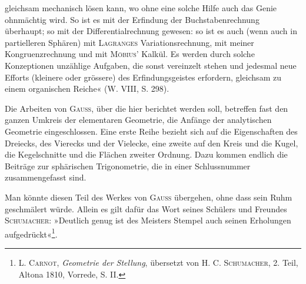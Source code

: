 gleichsam mechanisch lösen kann, wo ohne eine solche Hilfe auch das Genie
ohnmächtig wird. So ist es mit der Erfindung der Buchstabenrechnung
\clearpage{}
\noindent überhaupt; so mit der Differentialrechnung gewesen: so ist es auch (wenn auch
in partielleren Sphären) mit \textsc{Lagranges} Variationsrechnung, mit meiner Kongruenzrechnung
und mit \textsc{Möbius}’ Kalkül. Es werden durch solche Konzeptionen
unzählige Aufgaben, die sonst vereinzelt stehen und jedesmal neue
Efforts (kleinere oder grössere) des Erfindungsgeistes erfordern, gleichsam zu
einem organischen Reiche« (W. VIII, S. 298).
\par
Die Arbeiten von \textsc{Gauss}, über die hier berichtet werden soll, betreffen
fast den ganzen Umkreis der elementaren Geometrie, die Anfänge der analytischen
Geometrie eingeschlossen. Eine erste Reihe bezieht sich auf die Eigenschaften
des Dreiecks, des Vierecks und der Vielecke, eine zweite auf den
Kreis und die Kugel, die Kegelschnitte und die Flächen zweiter Ordnung.
Dazu kommen endlich die Beiträge zur sphärischen Trigonometrie, die in
einer Schlussnummer zusammengefasst sind.
\par
Man könnte diesen Teil des Werkes von \textsc{Gauss} übergehen, ohne dass
sein Ruhm geschmälert würde. Allein es gilt dafür das Wort seines Schülers
und Freundes \textsc{Schumacher}: »Deutlich genug ist des Meisters Stempel auch
seinen Erholungen aufgedrückt«\footnote{L. \textsc{Carnot}, \textit{Geometrie der Stellung}, übersetzt von H. C. \textsc{Schumacher}, 2. Teil, Altona 1810, Vorrede, S. II.}.
\clearpage\endgroup
